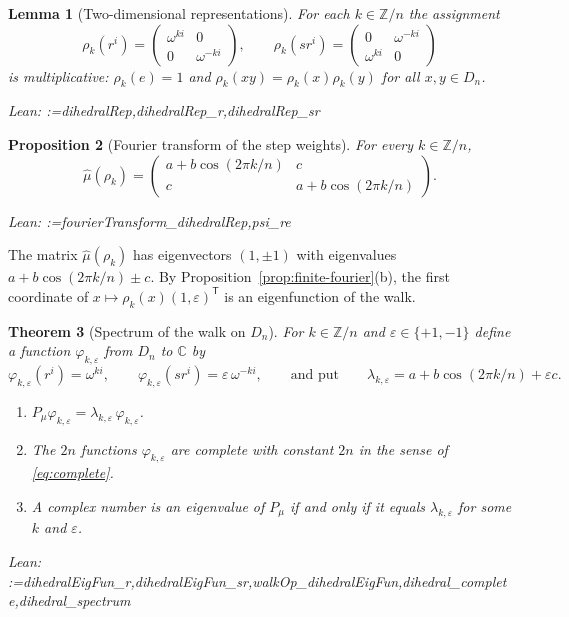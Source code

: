 \documentclass[11pt]{amsart}
\makeatletter
\newtheorem{theorem}{Theorem}[section]
\newtheorem{proposition}[theorem]{Proposition}
\newtheorem{lemma}[theorem]{Lemma}
\theoremstyle{definition}
\theoremstyle{remark}
\newcommand{\@leanlist}[1]{\def\@leansep{}\@for\@leanname:=#1\do{\@leansep
  \texttt{\expandafter\detokenize\expandafter{\@leanname}}\def\@leansep{, }}}
\newcommand{\lean}[1]{\par\smallskip\noindent
  {\footnotesize\normalfont\raggedright\textsf{Lean:} \@leanlist{#1}\par}}
\newcommand{\C}{\mathbb{C}}
\newcommand{\Z}{\mathbb{Z}}
\newcommand{\transp}{^{\mathsf T}}
\makeatother
\begin{document}
\begin{lemma}[Two-dimensional representations]\label{lem:dihedral-rep}
For each $k\in\Z/n$ the assignment
\[
  \rho_k(r^i)=\begin{pmatrix}\omega^{ki}&0\\0&\omega^{-ki}\end{pmatrix},\qquad
  \rho_k(sr^i)=\begin{pmatrix}0&\omega^{-ki}\\\omega^{ki}&0\end{pmatrix}
\]
is multiplicative: $\rho_k(e)=1$ and $\rho_k(xy)=\rho_k(x)\rho_k(y)$ for all $x,y\in D_n$.
\lean{dihedralRep,dihedralRep_r,dihedralRep_sr}
\end{lemma}

\begin{proposition}[Fourier transform of the step weights]\label{prop:dihedral-fourier}
For every $k\in\Z/n$,
\[
  \hat\mu(\rho_k)=\begin{pmatrix}a+b\cos(2\pi k/n)&c\\c&a+b\cos(2\pi k/n)\end{pmatrix}.
\]
\lean{fourierTransform_dihedralRep,psi_re}
\end{proposition}

The matrix $\hat\mu(\rho_k)$ has eigenvectors $(1,\pm1)$ with eigenvalues
$a+b\cos(2\pi k/n)\pm c$.  By Proposition~\ref{prop:finite-fourier}(b), the first coordinate of
$x\mapsto\rho_k(x)(1,\varepsilon)\transp$ is an eigenfunction of the walk.

\begin{theorem}[Spectrum of the walk on $D_n$]\label{thm:dihedral-spectrum}
For $k\in\Z/n$ and $\varepsilon\in\{+1,-1\}$ define a function $\varphi_{k,\varepsilon}$ from $D_n$ to $\C$ by
\[
  \varphi_{k,\varepsilon}(r^i)=\omega^{ki},\qquad\varphi_{k,\varepsilon}(sr^i)=\varepsilon\,\omega^{-ki},
  \qquad\text{and put}\qquad \lambda_{k,\varepsilon}=a+b\cos(2\pi k/n)+\varepsilon c .
\]
\begin{enumerate}
\item[(a)] $P_\mu\varphi_{k,\varepsilon}=\lambda_{k,\varepsilon}\,\varphi_{k,\varepsilon}$.
\item[(b)] The $2n$ functions $\varphi_{k,\varepsilon}$ are complete with constant $2n$ in the
sense of \eqref{eq:complete}.
\item[(c)] A complex number is an eigenvalue of $P_\mu$ if and only if it equals
$\lambda_{k,\varepsilon}$ for some $k$ and $\varepsilon$.
\end{enumerate}
\lean{dihedralEigFun_r,dihedralEigFun_sr,walkOp_dihedralEigFun,dihedral_complete,dihedral_spectrum}
\end{theorem}
\end{document}
